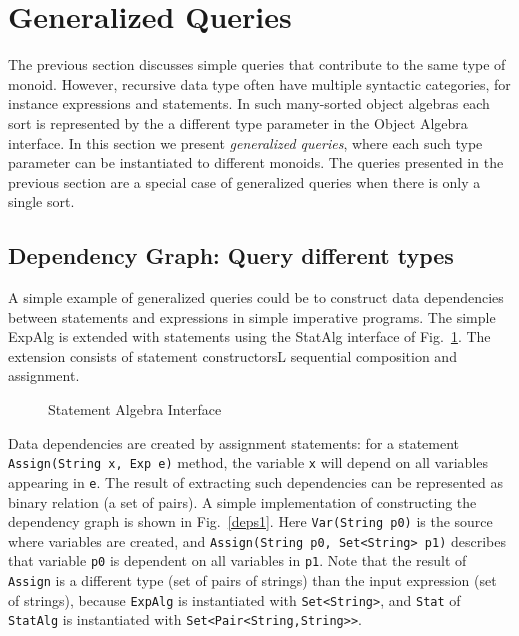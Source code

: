 \section{Generalized Queries}\label{sec:generalizedQueries}

The previous section discusses simple queries that contribute to the same type of monoid. However, recursive data type often have multiple syntactic categories, for instance expressions and statements.
In such many-sorted object algebras each sort is represented by the a different type parameter in the Object Algebra interface.
In this section we present \textit{generalized queries}, where each such type parameter can be instantiated to different monoids. 
The queries presented in the previous section are a special case of generalized queries when there is only a single sort.


\subsection{Dependency Graph: Query different types}\label{subsec:depGraph}

A simple example of generalized queries could be to construct data dependencies between statements and expressions in simple imperative programs. The simple ExpAlg is extended with statements using the StatAlg interface of Fig.~\ref{statalg}.
The extension consists of statement constructorsL sequential composition and assignment.

\begin{figure}[tb]
\vspace{-.1in}
\caption{Statement Algebra Interface}
\label{statalg}
\end{figure}

Data dependencies are created by assignment statements:
for a statement \lstinline{Assign(String x, Exp e)} method, the variable \lstinline{x} will depend on all variables appearing in \lstinline{e}.
The result of extracting such dependencies can be represented as binary relation (a set of pairs). 
A simple implementation of constructing the dependency graph is shown in Fig.~\ref{deps1}.
Here \lstinline{Var(String p0)} is the source where variables are created, and \lstinline{Assign(String p0, Set<String> p1)} describes that variable \lstinline{p0} is dependent on all variables in \lstinline{p1}.
Note that the result of \lstinline{Assign} is a different type (set of pairs of strings) than the input expression (set of strings), because \lstinline{ExpAlg} is instantiated with \lstinline{Set<String>}, and \lstinline{Stat} of \lstinline{StatAlg} is instantiated with \lstinline{Set<Pair<String,String>>}. 


